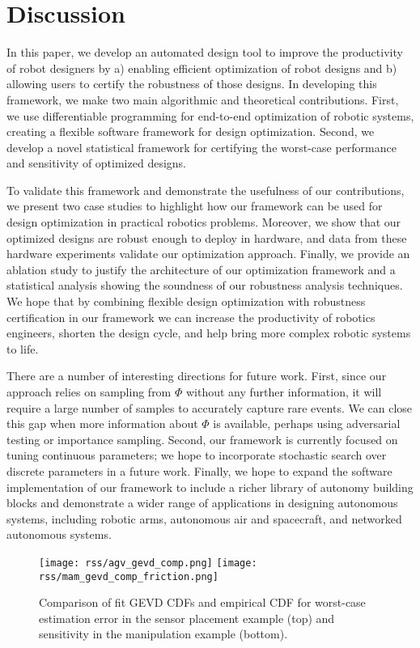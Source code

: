 \section{Discussion}

In this paper, we develop an automated design tool to improve the productivity of robot designers by a) enabling efficient optimization of robot designs and b) allowing users to certify the robustness of those designs. In developing this framework, we make two main algorithmic and theoretical contributions. First, we use differentiable programming for end-to-end optimization of robotic systems, creating a flexible software framework for design optimization. Second, we develop a novel statistical framework for certifying the worst-case performance and sensitivity of optimized designs.

To validate this framework and demonstrate the usefulness of our contributions, we present two case studies to highlight how our framework can be used for design optimization in practical robotics problems. Moreover, we show that our optimized designs are robust enough to deploy in hardware, and data from these hardware experiments validate our optimization approach. Finally, we provide an ablation study to justify the architecture of our optimization framework and a statistical analysis showing the soundness of our robustness analysis techniques. We hope that by combining flexible design optimization with robustness certification in our framework we can increase the productivity of robotics engineers, shorten the design cycle, and help bring more complex robotic systems to life.


There are a number of interesting directions for future work. First, since our approach relies on sampling from $\Phi$ without any further information, it will require a large number of samples to accurately capture rare events. We can close this gap when more information about $\Phi$ is available, perhaps using adversarial testing or importance sampling. Second, our framework is currently focused on tuning continuous parameters; we hope to incorporate stochastic search over discrete parameters in a future work. Finally, we hope to expand the software implementation of our framework to include a richer library of autonomy building blocks and demonstrate a wider range of applications in designing autonomous systems, including robotic arms, autonomous air and spacecraft, and networked autonomous systems.

\begin{figure}[tb]
    \centering
    \texttt{[image: rss/agv\_gevd\_comp.png]}
    \texttt{[image: rss/mam\_gevd\_comp\_friction.png]}
    \caption{Comparison of fit GEVD CDFs and empirical CDF for worst-case estimation error in the sensor placement example (top) and sensitivity in the manipulation example (bottom).}
    \label{ch:rss:fig:ks_test}
\end{figure}
